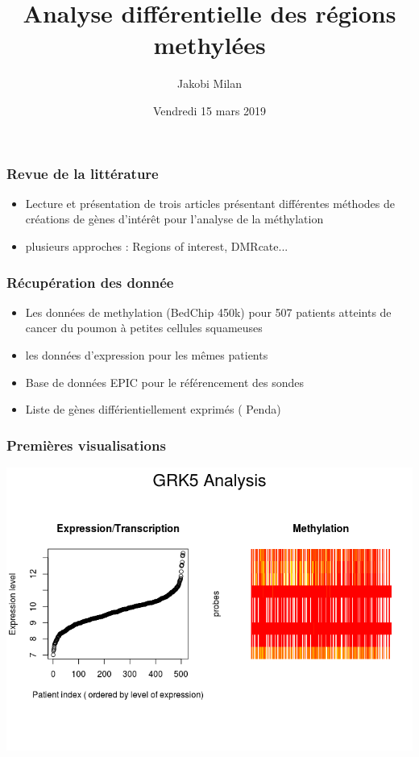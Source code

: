 \documentclass{beamer}
\begin{document}
\title[identification DMRs] 
{Analyse différentielle des régions methylées}
\author{Jakobi Milan}
\date[KPT 2004]{Vendredi 15 mars 2019}

\frame{\titlepage}

\begin{frame}
\frametitle{Revue de la littérature}
\begin{itemize}
\item Lecture et présentation de trois articles présentant différentes méthodes de créations de gènes d'intérêt pour l'analyse de la méthylation
\item plusieurs approches : Regions of interest, DMRcate...
\end{itemize}
\end{frame}

\begin{frame}
\frametitle{Récupération des donnée}
\begin{itemize}
\item Les données de methylation (BedChip 450k) pour 507 patients atteints de cancer du poumon à petites cellules squameuses
\item les données d'expression pour les mêmes patients
\item Base de données EPIC pour le référencement des sondes
\item Liste de gènes différientiellement exprimés ( Penda) 
\end{itemize}
\end{frame}

\begin{frame}
\frametitle{Premières visualisations}
\includegraphics[width=\textwidth]{GRK5_analysis.png}
\end{frame}
\end{document}

